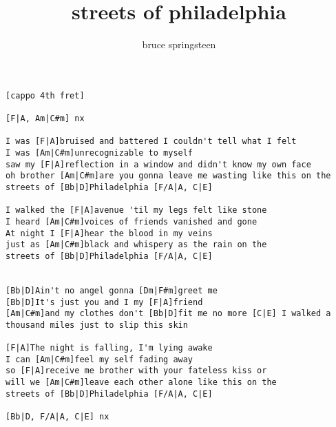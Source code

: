 \author{bruce springsteen}
\title{streets of philadelphia}
\maketitle
\begin{verbatim}
[cappo 4th fret]

[F|A, Am|C#m] nx

I was [F|A]bruised and battered I couldn't tell what I felt
I was [Am|C#m]unrecognizable to myself
saw my [F|A]reflection in a window and didn't know my own face
oh brother [Am|C#m]are you gonna leave me wasting like this on the
streets of [Bb|D]Philadelphia [F/A|A, C|E]

I walked the [F|A]avenue 'til my legs felt like stone
I heard [Am|C#m]voices of friends vanished and gone
At night I [F|A]hear the blood in my veins
just as [Am|C#m]black and whispery as the rain on the
streets of [Bb|D]Philadelphia [F/A|A, C|E]

                        
[Bb|D]Ain't no angel gonna [Dm|F#m]greet me
[Bb|D]It's just you and I my [F|A]friend
[Am|C#m]and my clothes don't [Bb|D]fit me no more [C|E] I walked a
thousand miles just to slip this skin

[F|A]The night is falling, I'm lying awake
I can [Am|C#m]feel my self fading away
so [F|A]receive me brother with your fateless kiss or
will we [Am|C#m]leave each other alone like this on the
streets of [Bb|D]Philadelphia [F/A|A, C|E]

[Bb|D, F/A|A, C|E] nx
\end{verbatim}
